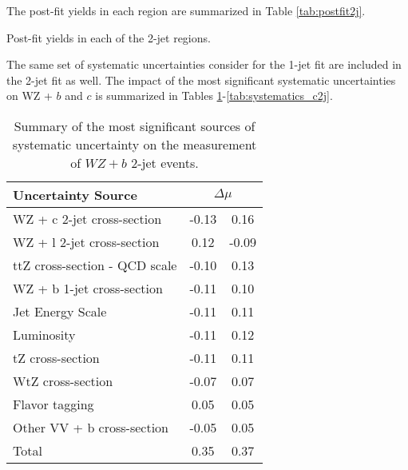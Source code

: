 The post-fit yields in each region are summarized in Table \ref{tab:postfit2j}.

\begin{table}[H]
\begin{adjustwidth}{-3em}{-3em}
\small

\caption{Post-fit yields in each of the 2-jet regions.}                                                         
\label{tab:postfit2j}
\end{adjustwidth}
\end{table}

The same set of systematic uncertainties consider for the 1-jet fit are included in the 2-jet fit as well. The impact of the most significant systematic uncertainties on WZ + $b$ and $c$ is summarized in Tables \ref{tab:systematics_2j}-\ref{tab:systematics_c2j}. 

\begin{table}[H]
    \centering
    \begin{tabular}{l|cc}
        \hline\hline
        Uncertainty Source & \multicolumn{2}{c}{$\Delta \mu$ }  \\
        \hline
        WZ + c 2-jet cross-section & -0.13 & 0.16 \\
        WZ + l 2-jet cross-section & 0.12 & -0.09 \\
        ttZ cross-section - QCD scale & -0.10 & 0.13 \\
        WZ + b 1-jet cross-section & -0.11 & 0.10 \\
        Jet Energy Scale & -0.11 & 0.11 \\
        Luminosity & -0.11 & 0.12 \\
        tZ cross-section & -0.11 & 0.11 \\
        WtZ cross-section & -0.07 & 0.07 \\
        Flavor tagging  & 0.05 & 0.05 \\
        Other VV + b cross-section & -0.05 & 0.05 \\
        \hline
        Total & 0.35 & 0.37 \\
        \hline\hline
    \end{tabular}
    \caption{Summary of the most significant sources of systematic uncertainty on the measurement of $WZ+b$ 2-jet events.}
    \label{tab:systematics_2j}
\end{table}

